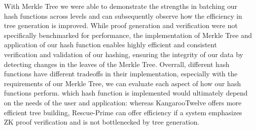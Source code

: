\documentclass[conference]{IEEEtran}
\begin{document}
With Merkle Tree we were able to demonstrate the strengths in batching our hash functions across levels and can subsequently observe how the efficiency in tree generation is improved. While proof generation and verification were not specifically benchmarked for performance, the implementation of Merkle Tree and application of our hash function enables highly efficient and consistent verification and validation of our hashing, ensuring the integrity of our data by detecting changes in the leaves of the Merkle Tree. Overrall, different hash functions have different tradeoffs in their implementation, especially with the requirements of our Merkle Tree, we can evaluate each aspect of how our hash functions perform. which hash function is implemented would ultimately depend on the needs of the user and application: whereas KangarooTwelve offers more efficient tree building, Rescue-Prime can offer efficiency if a system emphasizes ZK proof verification and is not bottlenecked by tree generation. 
\end{document}
